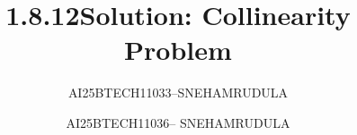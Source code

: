 \documentclass[journal]{IEEEtran}
\begin{document}

\vspace{3cm}

\title{1.8.12}
\author{AI25BTECH11033--SNEHAMRUDULA}
 \maketitle
{\let\newpage\relax\maketitle}

\renewcommand{\thefigure}{\theenumi}
\renewcommand{\thetable}{\theenumi}
\setlength{\intextsep}{10pt} %


\renewcommand{\thetable}{\theenumi}


\title{Solution: Collinearity Problem}
\author{AI25BTECH11036-- SNEHAMRUDULA}
\date{}
\end{document}

